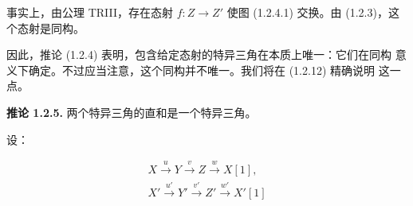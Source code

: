 事实上，由公理 TRIII，存在态射 $f\colon Z\longrightarrow Z'$ 使图
(1.2.4.1) 交换。由 (1.2.3)，这个态射是同构。

因此，推论 (1.2.4) 表明，包含给定态射的特异三角在本质上唯一：它们在同构
意义下确定。不过应当注意，这个同构并不唯一。我们将在 (1.2.12) 精确说明
这一点。

\medskip
\noindent\textbf{推论 1.2.5.}\quad
两个特异三角的直和是一个特异三角。

设：

\[
  \begin{gathered}
    X\xrightarrow{u}Y\xrightarrow{v}Z\xrightarrow{w}X[1],\\
    X'\xrightarrow{u'}Y'\xrightarrow{v'}Z'\xrightarrow{w'}X'[1]
  \end{gathered}
\]
\endgroup
